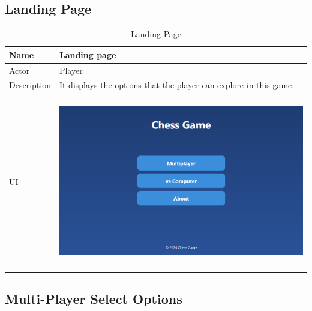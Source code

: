 \documentclass[a4paper,12pt]{article}
\begin{document}
\subsection{Landing Page}

\begin{longtable}{|m{}|m{}|}
    \caption{Landing Page} \\
    \hline
    Name & Landing page \\
    \hline
    Actor & Player \\
    \hline
    Description & It displays the options that the player can explore in this game. \\ 
    \hline
    \centering UI & 
    \begin{center}
        \includegraphics[height=2.7in]{Images/Use Cases/landingPage.png}
    \end{center} \\ 
    \hline
\end{longtable}

\subsection{Multi-Player Select Options}
\end{document}
